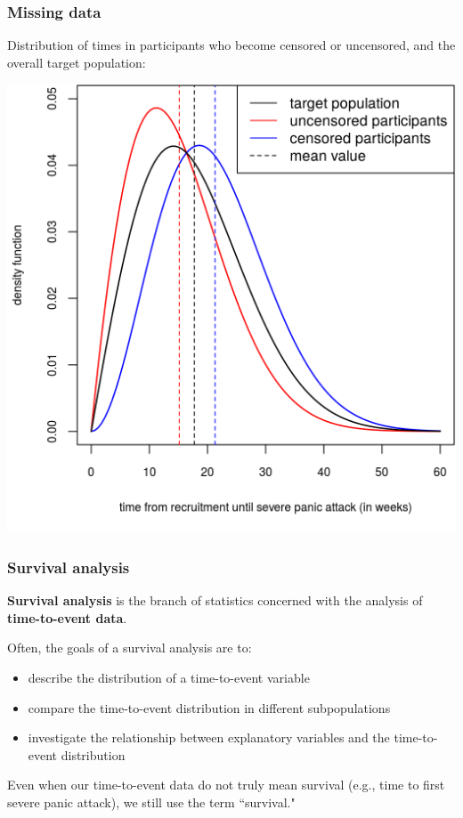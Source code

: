 \documentclass[10pt,t]{beamer}
\begin{document}
\begin{frame}
\frametitle{Missing data}
Distribution of times in participants who become censored or uncensored, and the overall target population:\vspace{-0.1cm}
\begin{center}
\includegraphics[height=0.8\textheight]{figs/meditation_density_versus_obs_time.png}
\end{center}
\end{frame}

\begin{frame}
\frametitle{Survival analysis}
\textbf{Survival analysis} is the branch of statistics concerned with the analysis of \textbf{time-to-event data}.

\vspace{0.3cm}

Often, the goals of a survival analysis are to:
\begin{itemize}
\item describe the distribution of a time-to-event variable
\item compare the time-to-event distribution in different subpopulations
\item investigate the relationship between explanatory variables and the time-to-event distribution
\end{itemize}

\vspace{0.3cm}

Even when our time-to-event data do not truly mean survival (e.g., time to first severe panic attack), we still use the term ``survival." 
\end{frame}
\end{document}
